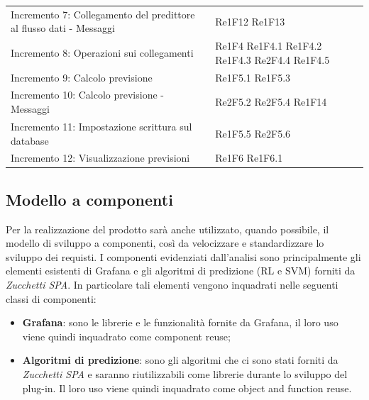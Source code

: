 \begin{longtable}{C{4cm} L{3cm}}
\\
Incremento 7: Collegamento del predittore al flusso dati - Messaggi &  Re1F12 \newline Re1F13
\\
Incremento 8: Operazioni sui collegamenti & Re1F4 \newline Re1F4.1 \newline Re1F4.2 \newline Re1F4.3 \newline Re2F4.4 \newline Re1F4.5
\\
Incremento 9: Calcolo previsione & Re1F5.1 \newline Re1F5.3
\\
Incremento 10: Calcolo previsione - Messaggi & Re2F5.2 \newline Re2F5.4 \newline Re1F14
\\
Incremento 11: Impostazione scrittura sul database & Re1F5.5 \newline  Re2F5.6
\\
Incremento 12: Visualizzazione previsioni & Re1F6 \newline Re1F6.1
\end{longtable}

\subsection{Modello a componenti}
Per la realizzazione del prodotto sarà anche utilizzato, quando possibile, il modello di sviluppo a componenti, così da velocizzare e standardizzare lo
sviluppo dei requisti. I componenti evidenziati dall’analisi sono principalmente
gli elementi esistenti di Grafana e gli algoritmi di predizione (RL e SVM) forniti
da \textit{Zucchetti SPA}. In particolare tali elementi vengono inquadrati nelle seguenti classi di componenti: \begin{itemize}
\item \textbf{Grafana}: sono le librerie e le funzionalità fornite da Grafana, il loro uso viene quindi inquadrato come component reuse;
\item \textbf{Algoritmi di predizione}: sono gli algoritmi che ci sono stati forniti da \textit{Zucchetti SPA} e saranno riutilizzabili come librerie durante lo sviluppo del plug-in. Il loro uso viene quindi inquadrato come object and
function reuse.
\end{itemize}